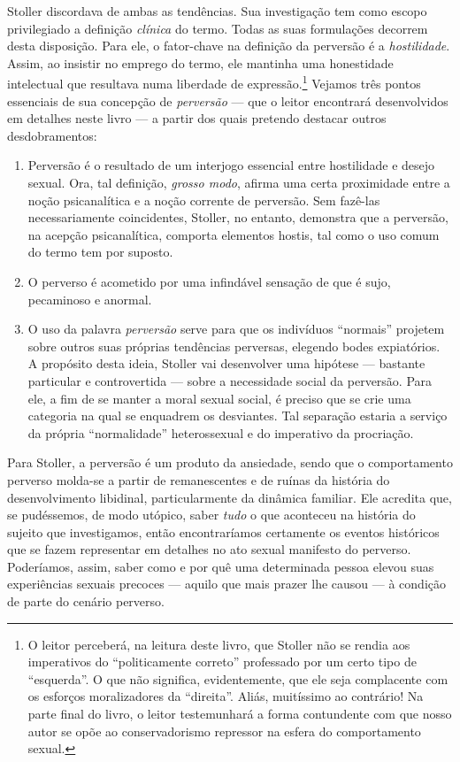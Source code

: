Stoller discordava de ambas as tendências. Sua investigação tem como
escopo privilegiado a definição \emph{clínica} do termo. Todas as suas
formulações decorrem desta disposição. Para ele, o fator-chave na
definição da perversão é a \emph{hostilidade}. Assim, ao insistir no
emprego do termo, ele mantinha uma honestidade intelectual que resultava
numa liberdade de expressão.\footnote{O leitor perceberá, na leitura
  deste livro, que Stoller não se rendia aos imperativos do
  ``politicamente correto'' professado por um certo tipo de
  ``esquerda''. O que não significa, evidentemente, que ele seja
  complacente com os esforços moralizadores da ``direita''. Aliás,
  muitíssimo ao contrário! Na parte final do livro, o leitor
  testemunhará a forma contundente com que nosso autor se opõe ao
  conservadorismo repressor na esfera do comportamento sexual.} Vejamos
três pontos essenciais de sua concepção de \emph{perversão} --- que o
leitor encontrará desenvolvidos em detalhes neste livro --- a partir dos
quais pretendo destacar outros desdobramentos:

\begin{enumerate}
\def\labelenumi{\arabic{enumi}.}
\item
  Perversão é o resultado de um interjogo essencial entre hostilidade e
  desejo sexual. Ora, tal definição, \emph{grosso modo}, afirma uma
  certa proximidade entre a noção psicanalítica e a noção corrente de
  perversão. Sem fazê-las necessariamente coincidentes, Stoller, no
  entanto, demonstra que a perversão, na acepção psicanalítica, comporta
  elementos hostis, tal como o uso comum do termo tem por suposto.
\item
  O perverso é acometido por uma infindável sensação de que é sujo,
  pecaminoso e anormal.
\item
  O uso da palavra \emph{perversão} serve para que os indivíduos
  ``normais'' projetem sobre outros suas próprias tendências perversas,
  elegendo bodes expiatórios. A propósito desta ideia, Stoller vai
  desenvolver uma hipótese --- bastante particular e controvertida ---
  sobre a necessidade social da perversão. Para ele, a fim de se manter
  a moral sexual social, é preciso que se crie uma categoria na qual se
  enquadrem os desviantes. Tal separação estaria a serviço da própria
  ``normalidade'' heterossexual e do imperativo da procriação.
\end{enumerate}

Para Stoller, a perversão é um produto da ansiedade, sendo que o
comportamento perverso molda-se a partir de remanescentes e de ruínas da
história do desenvolvimento libidinal, particularmente da dinâmica
familiar. Ele acredita que, se pudéssemos, de modo utópico, saber
\emph{tudo} o que aconteceu na história do sujeito que investigamos,
então encontraríamos certamente os eventos históricos que se fazem
representar em detalhes no ato sexual manifesto do perverso. Poderíamos,
assim, saber como e por quê uma determinada pessoa elevou suas
experiências sexuais precoces --- aquilo que mais prazer lhe causou ---
à condição de parte do cenário perverso.


